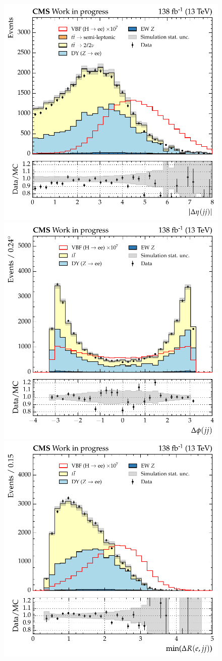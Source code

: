 \begin{figure}[htbp!]
\centering
\includegraphics[width =0.33\linewidth]{Figures/Hee/VBF/dataMC/all_inputs/VBF_BDT_dijetAbsDEta.pdf}\hfill%
\includegraphics[width =0.33\linewidth]{Figures/Hee/VBF/dataMC/all_inputs/VBF_BDT_dijetDPhi.pdf}\hfill%
\includegraphics[width =0.33\linewidth]{Figures/Hee/VBF/dataMC/all_inputs/VBF_BDT_dijetMinDRJetEle.pdf}\hfill%
 

\end{figure}
